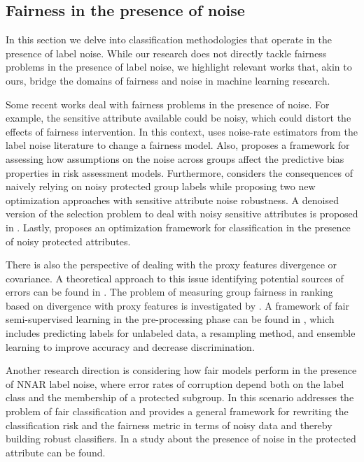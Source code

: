 \subsection{Fairness in the presence of noise}\label{sec:fairness_noise}

In this section we delve into classification methodologies that operate in the presence of label noise. While our research does not directly tackle fairness problems in the presence of label noise, we highlight relevant works that, akin to ours, bridge the domains of fairness and noise in machine learning research. 

Some recent works deal with fairness problems in the presence of noise. For example, the sensitive attribute available could be noisy, which could distort the effects of fairness intervention. In this context, \cite{Lamy2019} uses noise-rate estimators from the label noise literature to change a fairness model. Also, \cite{Fogliato2020} proposes a framework for assessing how assumptions on the noise across groups affect the predictive bias properties in risk assessment models. Furthermore, \cite{Wang2020} considers the consequences of naively relying on noisy protected group labels while proposing two new optimization approaches with sensitive attribute noise robustness. A denoised version of the selection problem to deal with noisy sensitive attributes is proposed in \cite{Mehrotra2021}. Lastly, \cite{Celis2021} proposes an optimization framework for classification in the presence of noisy protected attributes.

There is also the perspective of dealing with the proxy features divergence or covariance. A theoretical approach to this issue identifying potential sources of errors can be found in \cite{Prost2021}. The problem of measuring group fairness in ranking based on divergence with proxy features is investigated by \cite{Ghazimatin2022}. A framework of fair semi-supervised learning in the pre-processing phase can be found in \cite{Zhang2022}, which includes predicting labels for unlabeled data, a resampling method, and ensemble learning to improve accuracy and decrease discrimination.

Another research direction is considering how fair models perform in the presence of NNAR label noise, where error rates of corruption depend both on the label class and the membership of a protected subgroup. In this scenario \cite{Wang2021} addresses the problem of fair classification and \cite{Wu2022} provides a general framework for rewriting the classification risk and the fairness metric in terms of noisy data and thereby building robust classifiers. In \cite{Ghosh2023} a study about the presence of noise in the protected attribute can be found.

